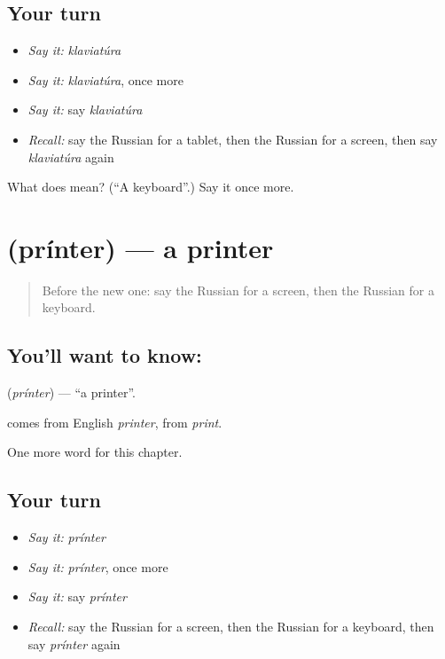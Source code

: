 \subsection*{Your turn}
\begin{itemize}
\raggedright
  \item \emph{Say it:} \emph{klaviatúra}
  \item \emph{Say it:} \emph{klaviatúra}, once more
  \item \emph{Say it:} say \emph{klaviatúra}
  \item \emph{Recall:} say the Russian for a tablet, then the Russian for a screen, then say \emph{klaviatúra} again
\end{itemize}

\begin{tcolorbox}[breakable,colback=teal!4,colframe=teal!35!black,title={Before you move on}]
What does  mean? (\textquotedblleft{}A keyboard\textquotedblright{}.) Say it once more.
\end{tcolorbox}
\section[\texorpdfstring{\ru{принтер} (prínter)}{принтер (prínter)}]{ (prínter) — a printer}

\label{lesson:RU-C220-printer}



\begin{quote}
Before the new one: say the Russian for a screen, then the Russian for a keyboard.
\end{quote}

\subsection*{You'll want to know: }
\textbf{} (\emph{prínter}) — \textquotedblleft{}a printer\textquotedblright{}.

\begin{cousinweb}
\textbf{} comes from English \emph{printer}, from \emph{print}.
\end{cousinweb}

\begin{grammarlens}[title={What you've built}]
One more word for this chapter.
\end{grammarlens}

\subsection*{Your turn}
\begin{itemize}
\raggedright
  \item \emph{Say it:} \emph{prínter}
  \item \emph{Say it:} \emph{prínter}, once more
  \item \emph{Say it:} say \emph{prínter}
  \item \emph{Recall:} say the Russian for a screen, then the Russian for a keyboard, then say \emph{prínter} again
\end{itemize}

